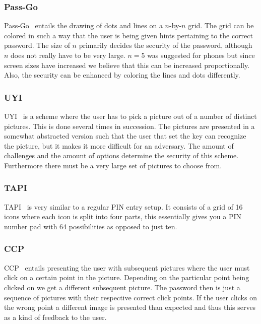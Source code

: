 \documentclass[conference, 11pt]{sty/IEEEtran}
\begin{document}
\subsubsection{Pass-Go}
\label{sssec:pass_go}

Pass-Go~\cite{tao2008pass} entails the drawing of dots and lines on a $n$-by-$n$ grid.
The grid can be colored in such a way that the user is being given hints pertaining to the correct password.
The size of $n$ primarily decides the security of the password, although $n$ does not really have to be very large.
$n = 5$ was suggested for phones but since screen sizes have increased we believe that this can be increased proportionally.
Also, the security can be enhanced by coloring the lines and dots differently.

\subsubsection{UYI}
\label{sssec:uyi}

UYI~\cite{hayashi2008use} is a scheme where the user has to pick a picture out of a number of distinct pictures.
This is done several times in succession.
The pictures are presented in a somewhat abstracted version such that the user that set the key can recognize the picture, but it makes it more difficult for an adversary.
The amount of challenges and the amount of options determine the security of this scheme.
Furthermore there must be a very large set of pictures to choose from.


\subsubsection{TAPI}
\label{sssec:tapi}

TAPI~\cite{citty2010tapi} is very similar to a regular PIN entry setup.
It consists of a grid of 16 icons where each icon is split into four parts, this essentially gives you a PIN number pad with 64 possibilities as opposed to just ten.

\subsubsection{CCP}
\label{sssec:ccp}

CCP~\cite{chiasson2007graphical} entails presenting the user with subsequent pictures where the user must click on a certain point in the picture.
Depending on the particular point being clicked on we get a different subsequent picture.
The password then is just a sequence of pictures with their respective correct click points.
If the user clicks on the wrong point a different image is presented than expected and thus this serves as a kind of feedback to the user.
\end{document}
